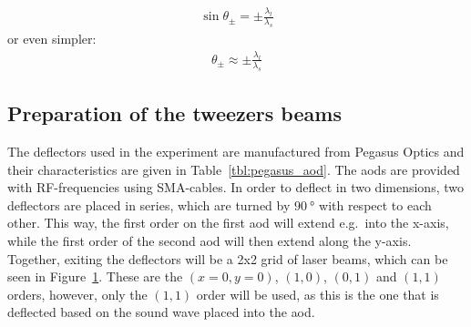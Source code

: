 \begin{align}
	\sin \theta_\pm = \pm \frac{\lambda_l}{\lambda_s}
\end{align}
or even simpler:
\begin{align}
	\theta_\pm \approx \pm \frac{\lambda_l}{\lambda_s}
\end{align}

\begin{figure}[t]
\end{figure}

\subsection{Preparation of the tweezers beams}

The deflectors used in the experiment are manufactured from Pegasus Optics and their characteristics are given in Table~\ref{tbl:pegasus_aod}. The \acp{aod} are provided with RF-frequencies using SMA-cables. In order to deflect in two dimensions, two deflectors are placed in series, which are turned by $\SI{90}{\degree}$ with respect to each other. This way, the first order on the first \ac{aod} will extend e.g.\ into the x-axis, while the first order of the second \ac{aod} will then extend along the y-axis. Together, exiting the deflectors will be a 2x2 grid of laser beams, which can be seen in Figure~\ref{fig:aod_pass}. These are the $(x=0, y=0)$, $(1, 0)$, $(0, 1)$ and $(1, 1)$ orders, however, only the $(1,1)$ order will be used, as this is the one that is deflected based on the sound wave placed into the \ac{aod}.

\begin{figure}[ht]
	\label{fig:aod_pass}
\end{figure}

